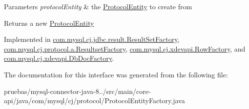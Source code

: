\begin{DoxyParams}{Parameters}
{\em protocol\+Entity} & the \mbox{\hyperlink{interfacecom_1_1mysql_1_1cj_1_1protocol_1_1_protocol_entity}{Protocol\+Entity}} to create from \\
\hline
\end{DoxyParams}
\begin{DoxyReturn}{Returns}
a new \mbox{\hyperlink{interfacecom_1_1mysql_1_1cj_1_1protocol_1_1_protocol_entity}{Protocol\+Entity}} 
\end{DoxyReturn}


Implemented in \mbox{\hyperlink{classcom_1_1mysql_1_1cj_1_1jdbc_1_1result_1_1_result_set_factory_a5638ebeb2a785cacf994cadafbfbaac7}{com.\+mysql.\+cj.\+jdbc.\+result.\+Result\+Set\+Factory}}, \mbox{\hyperlink{classcom_1_1mysql_1_1cj_1_1protocol_1_1a_1_1_resultset_factory_a3ee901bd2ae369a6c99f8c38c280c407}{com.\+mysql.\+cj.\+protocol.\+a.\+Resultset\+Factory}}, \mbox{\hyperlink{classcom_1_1mysql_1_1cj_1_1xdevapi_1_1_row_factory_a4320a0bcea400bcd2324daf031ee752f}{com.\+mysql.\+cj.\+xdevapi.\+Row\+Factory}}, and \mbox{\hyperlink{classcom_1_1mysql_1_1cj_1_1xdevapi_1_1_db_doc_factory_ae8ecf27e89019d6b8949a7821ce1c8fe}{com.\+mysql.\+cj.\+xdevapi.\+Db\+Doc\+Factory}}.



The documentation for this interface was generated from the following file\+:\begin{DoxyCompactItemize}
\item 
pruebas/mysql-\/connector-\/java-\/8../src/main/core-\/api/java/com/mysql/cj/protocol/Protocol\+Entity\+Factory.\+java\end{DoxyCompactItemize}
